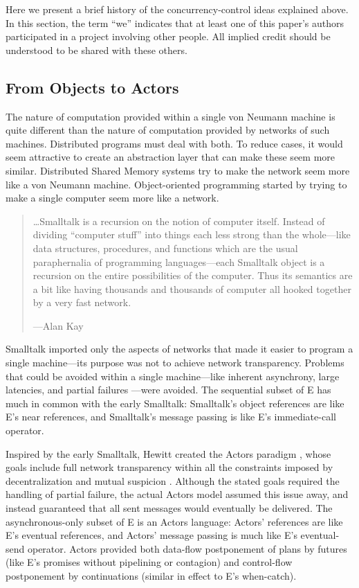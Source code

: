 \documentclass{llncs}
\begin{document}
Here we present a brief history of the concurrency-control ideas
explained above. In this section, the term ``we'' indicates that at
least one of this paper's authors participated in a project involving
other people. All implied credit should be understood to be shared
with these others.

\subsection{From Objects to Actors}

The nature of computation provided within a single von Neumann machine
is quite different than the nature of computation provided by networks
of such machines. Distributed programs must deal with both. To reduce
cases, it would seem attractive to create an abstraction layer that
can make these seem more similar. Distributed Shared Memory systems
\cite{dsm-survey} try to make the network seem more like a von Neumann
machine. Object-oriented programming started by trying to make a
single computer seem more like a network.
%
\begin{quotation}
\ldots Smalltalk is a recursion on the notion of computer
itself. Instead of dividing ``computer stuff'' into things each less
strong than the whole---like data structures, procedures, and
functions which are the usual paraphernalia of programming
languages---each Smalltalk object is a recursion on the entire
possibilities of the computer. Thus its semantics are a bit like
having thousands and thousands of computer all hooked together by a
very fast network.
\begin{flushright}
---Alan Kay \cite{kay:smallhistory}
\end{flushright}
\end{quotation}
%
Smalltalk imported only the aspects of networks that made it easier to
program a single machine---its purpose was not to achieve network
transparency. Problems that could be avoided within a single
machine---like inherent asynchrony, large latencies, and partial
failures \cite{waldo:note}---were avoided. The sequential subset of E
has much in common with the early Smalltalk: Smalltalk's object
references are like E's near references, and Smalltalk's message
passing is like E's immediate-call operator.

Inspired by the early Smalltalk, Hewitt created the Actors
paradigm \cite{hewitt:actors}, whose goals include full network
transparency within all the constraints imposed by decentralization
and mutual suspicion \cite{hewitt:challenge}. Although the stated
goals required the handling of partial failure, the actual Actors
model assumed this issue away, and instead guaranteed that all sent
messages would eventually be delivered. The asynchronous-only subset
of E is an Actors language: Actors' references are like E's eventual
references, and Actors' message passing is much like E's eventual-send
operator. Actors provided both data-flow postponement of plans by
futures (like E's promises without pipelining or contagion) and
control-flow postponement by continuations (similar in effect to E's
when-catch).
\end{document}
